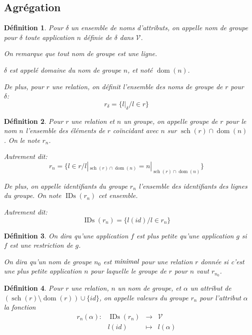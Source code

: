 \documentclass[french]{article}
\DeclareMathOperator{\dom}{dom}
\DeclareMathOperator{\s}{sch}
\DeclareMathOperator{\ids}{IDs}
\newcommand{\val}{\mathcal{V}}
\newtheorem{defi}{Définition}
\begin{document}
\subsection*{Agrégation}

\begin{defi}
	Pour $\delta$ un ensemble de noms d'attributs,
	on appelle \emph{nom de groupe pour $\delta$}
	toute application $n$ définie de $\delta$
	dans $\val$.
	
	On remarque que tout nom de groupe est une ligne.
	
	$\delta$ est appelé \emph{domaine} du nom de groupe $n$,
	et noté $\dom(n)$.
	
	De plus, pour $r$ une relation, on définit
	\emph{l'ensemble des noms de groupe de $r$ pour $\delta$}:
	$$
	r_\delta = \{l|_\delta / l \in r \}
	$$
\end{defi}

\begin{defi}
	Pour $r$ une relation et $n$ un groupe, on appelle
	\emph{groupe de $r$ pour le nom $n$} l'ensemble
	des éléments de $r$ coïncidant avec $n$ 
	sur $\s(r)\cap\dom(n)$. On le note $r_n$.
	
	Autrement dit:
	$$
	r_n = \{l \in r / l|_{\s(r)\cap\dom(n)}  = n|_{\s(r)\cap\dom(n)} \}
	$$
	
	De plus, on appelle \emph{identifiants du groupe $r_n$} l'ensemble
	des identifiants des lignes du groupe. On note $\ids(r_n)$ cet ensemble.
	
	Autrement dit:
	$$
	\ids(r_n) = \{ l(id) / l \in r_n \}
	$$
\end{defi}

\begin{defi}
	On dira qu'une application $f$ est \emph{plus petite}
	qu'une application $g$ si $f$ est une restriction de $g$.
	
	On dira qu'un nom de groupe $n_0$ est $\emph{minimal}$
	pour une relation $r$ donnée
	si c'est une plus petite application $n$ pour laquelle
	le groupe de $r$ pour $n$ vaut $r_{n_0}$.
\end{defi}

\begin{defi}
	Pour $r$ une relation, $n$ un nom de groupe,
	et $\alpha$ un attribut de
	$(\s(r) \setminus \dom(r)) \cup \{id\}$,
	on appelle \emph{valeurs du groupe $r_n$ pour
		l'attribut $\alpha$}
	la fonction
	$$
	\begin{array}{llcl}
	r_n(\alpha) : & \ids(r_n) & \rightarrow & \val \\
			& l(id) & \mapsto & l(\alpha)
	\end{array}
	$$
\end{defi}
	
\end{document}
